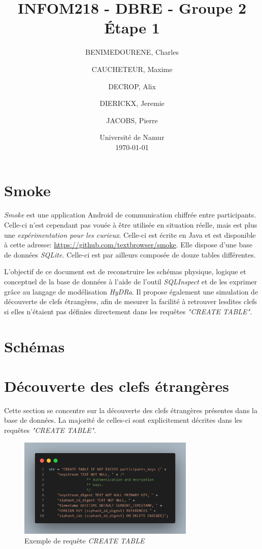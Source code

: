 \documentclass[french]{report}
\title{INFOM218 - DBRE - Groupe 2 \\ \Huge Étape 1}
\author{BENIMEDOURENE, Charles \and CAUCHETEUR, Maxime \and DECROP, Alix \and DIERICKX, Jeremie \and JACOBS, Pierre}
\date{{\large Université de Namur} \\ \today}
\begin{document}
	
	\maketitle
	\newpage
	\tableofcontents
	
	\newpage
	
	\section{Smoke}
	
	\textit{Smoke} est une application Android de communication chiffrée entre participants. Celle-ci n'est cependant pas vouée à être utilisée en situation réelle, mais est plus une \textit{expérimentation pour les curieux}. Celle-ci est écrite en Java et est disponible à cette adresse: \url{https://github.com/textbrowser/smoke}. Elle dispose d'une base de données \textit{SQLite}. Celle-ci est par ailleurs composée de douze tables différentes.
	
	L'objectif de ce document est de reconstruire les schémas physique, logique et conceptuel de la base de données à l'aide de l'outil \textit{SQLInspect} et de les exprimer grâce au langage de modélisation \textit{HyDRa}. Il propose également une simulation de découverte de clefs étrangères, afin de mesurer la facilité à retrouver lesdites clefs si elles n'étaient pas définies directement dans les requêtes \textit{"CREATE TABLE"}.

	\section{Schémas}
	\section{Découverte des clefs étrangères}
	
	Cette section se concentre sur la découverte des clefs étrangères présentes dans la base de données. La majorité de celles-ci sont explicitement décrites dans les requêtes \textit{"CREATE TABLE"}. 
	
	\begin{figure}[h!]
		\centering
		\includegraphics[width=0.75\textwidth]{imgs/create_table.png}
		\caption{Exemple de requête \textit{CREATE TABLE}}
		\label{fig::create_table}
	\end{figure}
\end{document}
